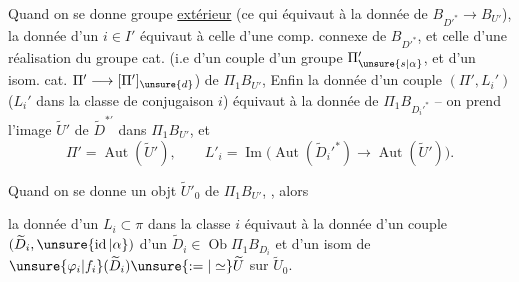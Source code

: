 Quand on se donne   groupe \uline{extérieur}  (ce qui  équivaut à la donnée de \(B_{D'^*}\longrightarrow B_{U'}\)), la donnée d'un  \(i\in I'\) équivaut à celle d'une comp. connexe de \(B_{D'^*}\), et celle d'une réalisation  du groupe cat. (i.e d'un couple d'un groupe \(\Pi'_{\unsure{s|\alpha}}\), et d'un isom. cat. \(\Pi'\longrightarrow[\Pi']_{\unsure{d}}\))   de \(\Pi_1B_{U'}\), Enfin la donnée d'un couple \((\Pi',L_i')\) (\(L_i'\) dans la classe de conjugaison \(i\)) équivaut  à la donnée   de \(\Pi_1B_{D_i'^*}\) -- on prend l'image \(\widetilde U'\) de \(\widetilde D^{*'}\) dans \(\Pi_1B_{U'}\), et
\[
\Pi'=\operatorname{Aut}(\widetilde U'),\qquad
L'_i=\operatorname{Im}\bigl(\operatorname{Aut}(\widetilde D_i'^*)\longrightarrow
\operatorname{Aut}(\widetilde U')\bigr).
\]

Quand on se donne   un objt \(\widetilde U'_0\) de \(\Pi_1B_{U'}\),  , alors


la donnée d'un \(L_i\subset\pi\) dans la classe \(i\) équivaut à la donnée d'un couple \((\widetilde D_i,\unsure{\operatorname{id}|\alpha})\) d'un \(\widetilde D_i\in\operatorname{Ob}\Pi_1B_{D_i}\) et d'un isom de \(\unsure{\varphi_i|f_i}(\widetilde D_i)\unsure{:=|\simeq}\widetilde U\) sur \(\widetilde U_0\).

